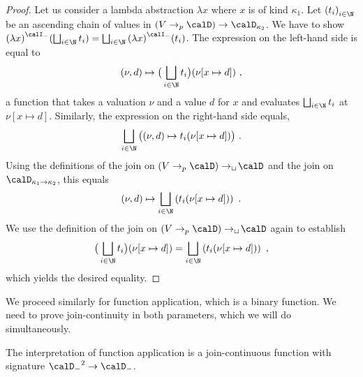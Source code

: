 \documentclass[../../diss.tex]{subfiles}
\begin{document}
\begin{proof}
    Let us consider a lambda abstraction $\lambda x$ where $x$ is of kind $\kappa_1$.
    Let ${(t_i)}_{i \in \N}$ be an ascending chain of values in $(V \pto \domain) \to \domain{\kappa_2}$.
    We have to show ${(\lambda x)}^\interpretationt (\bigsqcup_{i \in \N} t_i) = \bigsqcup_{i \in \N} {(\lambda x)}^\interpretationt (t_i)$.
    The expression on the left-hand side is equal to
    \[
        (\nu, d) \mapsto \big( \bigsqcup_{i \in \N } t_i \big) (\nu [x \mapsto d])
        \ ,
    \]
    a function that takes a valuation $\nu$ and a value $d$ for $x$ and evaluates $\bigsqcup_{i \in \N } t_i$ at $\nu [ x \mapsto d]$.
    Similarly, the expression on the right-hand side equals,
    \[
        \bigsqcup_{i \in \N } \big( (\nu, d) \mapsto t_i (\nu [x \mapsto d]) \big)
        \ .
    \]
    Using the definitions of the join on $(V \pto \domain) \cto \domain$ and the join on $\domain{\kappa_1 \to \kappa_2}$, this equals
    \[
        (\nu, d) \mapsto \bigsqcup_{i \in \N } \left( t_i (\nu [x \mapsto d]) \right)
        \ .
    \]
    We use the definition of the join on $(V \pto \domain) \cto \domain$ again to establish
    \[
        \big( \bigsqcup_{i \in \N } t_i \big) (\nu [x \mapsto d]) = \bigsqcup_{i \in \N } \left( t_i (\nu [x \mapsto d]) \right)
        \ ,
    \]
    which yields the desired equality.
\end{proof}

We proceed similarly for function application, which is a binary function.
We need to prove join-continuity in both parameters, which we will do simultaneously.

\begin{lemma}%
\label{Lemma:HORSTemplateApplicationJoinCont}%
    The interpretation of function application is a join-continuous function with signature ${\domaint}^2 \to \domaint$.
\end{lemma}
\end{document}
